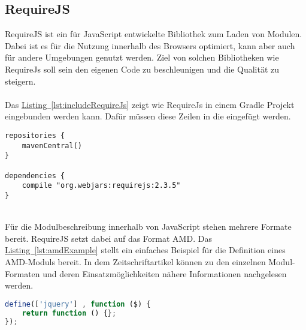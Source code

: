 \subsection{RequireJS}\label{sec:requireJs}
RequireJS \cite{requirejs} ist ein für JavaScript entwickelte Bibliothek zum Laden von Modulen. Dabei ist es für die Nutzung innerhalb des Browsers optimiert, kann aber auch für andere Umgebungen genutzt werden. Ziel von solchen Bibliotheken wie RequireJs soll sein den eigenen Code zu beschleunigen und die Qualität zu steigern.\\
\\
Das \hyperref[lst:includeRequireJs]{Listing~\ref{lst:includeRequireJs}} zeigt wie RequireJs in einem Gradle Projekt eingebunden werden kann. Dafür müssen diese Zeilen in die  eingefügt werden.\\
\begin{lstlisting}[style=lstStyleFramed, language=Gradle, caption={Einbindung der Bibliothek RequireJs mithilfe von Gradle}, label=lst:includeRequireJs, float]
repositories {
	mavenCentral()
}

dependencies {
	compile "org.webjars:requirejs:2.3.5"
}
\end{lstlisting}
\\
Für die Modulbeschreibung innerhalb von JavaScript stehen mehrere Formate bereit. RequireJS setzt dabei auf das Format \gls{AMD}. Das \hyperref[lst:amdExample]{Listing~\ref{lst:amdExample}} stellt ein einfaches Beispiel für die Definition eines \gls{AMD}-Moduls bereit. In dem Zeitschriftartikel \cite{jsModuleDefinitions} können zu den einzelnen Modul-Formaten und deren Einsatzmöglichkeiten nähere Informationen nachgelesen werden.
\\
\begin{lstlisting}[style=lstStyleFramed, language=JavaScript, caption={Beispiel: Moduldefinition mittels AMD \cite{requirejsExample}}, label=lst:amdExample, float]
define(['jquery'] , function ($) {
	return function () {};
});
\end{lstlisting}

